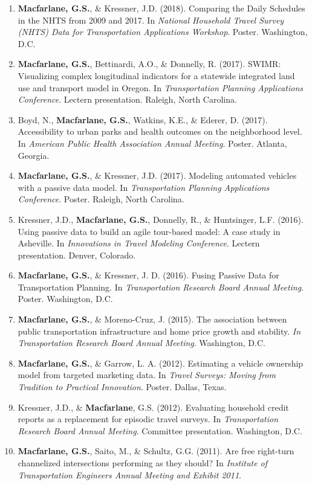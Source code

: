 \documentclass[margin,line]{res}
\newif\ifdetail
\newcounter{enuminitialize}
\newenvironment{myenum}[1][]
{%
 \setcounter{enuminitialize}{#1}
 \addtocounter{enuminitialize}{2}
 \begin{enumerate}[left= 4pt, itemsep=8pt, start=\value{enuminitialize}, label=\arabic*\addtocounter{enumi}{-2}]
}
{%
 \end{enumerate}
}
\begin{document}
\begin{resume}
\begin{myenum}[34]
\item \textbf{Macfarlane, G.S.}, \& Kressner, J.D. (2018). Comparing the Daily Schedules in the NHTS from 2009 and 2017. In \textit{ National Household Travel Survey (NHTS) Data for Transportation Applications Workshop}. Poster. Washington, D.C.
\item \textbf{Macfarlane, G.S.}, Bettinardi, A.O., \& Donnelly, R. (2017). SWIMR: Visualizing complex longitudinal indicators for a statewide integrated land use and transport model in Oregon. In \textit{Transportation Planning Applications Conference}. Lectern presentation. Raleigh, North Carolina.
\item Boyd, N., \textbf{Macfarlane, G.S.}, Watkins, K.E., \& Ederer, D. (2017). Accessibility to urban parks and health outcomes on the neighborhood level. In \textit{ American Public Health Association Annual Meeting}. Poster. Atlanta, Georgia.
\item \textbf{Macfarlane, G.S.}, \& Kressner, J.D. (2017). Modeling automated vehicles with a passive data model. In \textit{ Transportation Planning Applications Conference}. Poster. Raleigh, North Carolina.
\item Kressner, J.D., \textbf{Macfarlane, G.S.}, Donnelly, R., \& Huntsinger, L.F. (2016). Using passive data to build an agile tour-based model: A case study in Asheville. In \textit{ Innovations in Travel Modeling Conference}. Lectern presentation. Denver, Colorado. \ifdetail Citations: 7  \fi
\item \textbf{Macfarlane, G.S.}, \& Kressner, J. D. (2016). Fusing Passive Data for Transportation Planning. In \textit{ Transportation Research Board Annual Meeting}. Poster. Washington, D.C.
\item \textbf{Macfarlane, G.S.}, \& Moreno-Cruz, J. (2015). The association between public transportation infrastructure and home price growth and stability. \textit{ In Transportation Research Board Annual Meeting}. Washington, D.C.
\item \textbf{Macfarlane, G.S.}, \& Garrow, L. A. (2012). Estimating a vehicle ownership model from targeted marketing data. In \textit{ Travel Surveys: Moving from Tradition to Practical Innovation}. Poster. Dallas, Texas.
\item Kressner, J.D., \& \textbf{Macfarlane}, G.S. (2012). Evaluating household credit reports as a replacement for episodic travel surveys. In \textit{ Transportation Research Board Annual Meeting}. Committee presentation. Washington, D.C.
\item \textbf{Macfarlane, G.S.}, Saito, M., \& Schultz, G.G. (2011). Are free right-turn channelized intersections performing as they should? In \textit{ Institute of Transportation Engineers Annual Meeting and Exhibit 2011}.
\end{myenum}




\end{resume}
\end{document}
